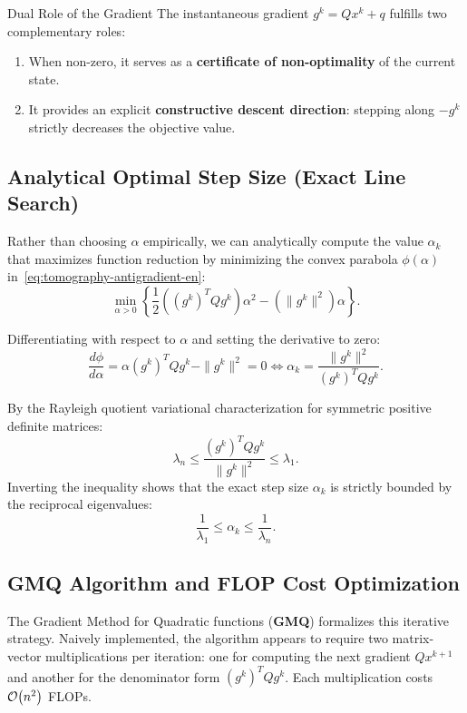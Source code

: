\begin{noteblock}{Dual Role of the Gradient}
The instantaneous gradient $g^k = Q x^k + q$ fulfills two complementary roles:
\begin{enumerate}
    \item When non-zero, it serves as a \textbf{certificate of non-optimality} of the current state.
    \item It provides an explicit \textbf{constructive descent direction}: stepping along $-g^k$ strictly decreases the objective value.
\end{enumerate}
\end{noteblock}

\subsection{Analytical Optimal Step Size (Exact Line Search)}
Rather than choosing $\alpha$ empirically, we can analytically compute the value $\alpha_k$ that maximizes function reduction by minimizing the convex parabola $\phi(\alpha)$ in~\eqref{eq:tomography-antigradient-en}:
\begin{equation}
    \min_{\alpha > 0} \left\{ \frac{1}{2} \left( (g^k)^T Q g^k \right) \alpha^2 - \left( \|g^k\|^2 \right) \alpha \right\}.
\end{equation}

Differentiating with respect to $\alpha$ and setting the derivative to zero:
\begin{equation}
    \frac{d\phi}{d\alpha} = \alpha (g^k)^T Q g^k - \|g^k\|^2 = 0 \iff \alpha_k = \frac{\|g^k\|^2}{(g^k)^T Q g^k}.
    \label{eq:optimal-stepsize-en}
\end{equation}

\begin{property}
By the Rayleigh quotient variational characterization for symmetric positive definite matrices:
\begin{equation}
    \lambda_n \le \frac{(g^k)^T Q g^k}{\|g^k\|^2} \le \lambda_1.
\end{equation}
Inverting the inequality shows that the exact step size $\alpha_k$ is strictly bounded by the reciprocal eigenvalues:
\begin{equation}
    \frac{1}{\lambda_1} \le \alpha_k \le \frac{1}{\lambda_n}.
\end{equation}
\end{property}

\subsection{GMQ Algorithm and FLOP Cost Optimization}
The Gradient Method for Quadratic functions (\textbf{GMQ}) formalizes this iterative strategy. Naively implemented, the algorithm appears to require two matrix-vector multiplications per iteration: one for computing the next gradient $Q x^{k+1}$ and another for the denominator form $(g^k)^T Q g^k$. Each multiplication costs $\mathcal{O}\!\left(n^2\right)$ FLOPs.

